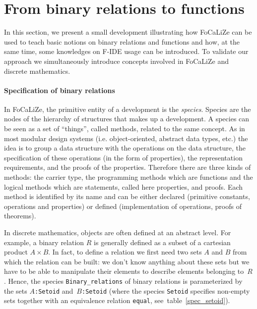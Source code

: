 \documentclass[submission,copyright,creativecommons]{eptcs}
\def\focalize{FoCaLiZe \mbox{}}
\begin{document}
\section{From binary relations to functions}

In this section, we present a small development illustrating how
\focalize can be used to teach basic notions on binary relations and
functions and how, at the same time, 
some knowledges on F-IDE usage can be introduced.
To validate our approach we simultaneously introduce concepts involved
in \focalize and discrete mathematics.

\paragraph{Specification of binary relations}
In FoCaLiZe, the primitive entity of a development is the \emph{species}.
Species are the nodes of the
hierarchy of structures that makes up a development.
A species can be seen as a set of ``things'', called methods, related
to the same concept. As in most modular design systems
(i.e. object-oriented, abstract data types, etc.) the idea is
to group a data structure with the operations on the data structure, the
specification of these operations (in the form of properties), the
representation requirements, and the proofs of the properties.
Therefore there are three kinds of methods: the carrier type, the
programming methods which are functions  and the logical methods which
are statements, called here properties,  and proofs.
Each method is identified by
its name and can be either declared 
(primitive constants, operations and properties)
or defined (implementation of operations, proofs of theorems).

In discrete mathematics, objects are often defined at an abstract
level. For example, a binary relation $R$ is generally defined as a subset
of a cartesian product $A \times B$. In fact, to define a relation we first need
two sets $A$ and $B$ from which the relation can be built: we don't know anything about these sets
but we have to be able to manipulate their elements to describe
elements belonging to~$R$. Hence, the
species {\footnotesize \tt Binary\_relations} 
of binary relations is parameterized by the sets {\footnotesize \tt $A$:Setoid} 
and~{\footnotesize \tt $B$:Setoid}  (where the species {\footnotesize \tt Setoid} specifies
non-empty sets together with an equivalence relation {\footnotesize \tt equal}, 
see~table~\ref{spec_setoid}). 
\end{document}
